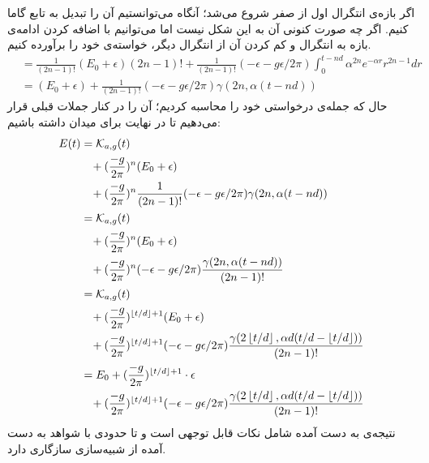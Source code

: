 اگر بازه‌ی انتگرال اول از صفر شروع می‌شد؛ آنگاه می‌توانستیم آن را تبدیل به تابع گاما کنیم. اگر چه صورت کنونی آن به این شکل نیست اما می‌توانیم با اضافه کردن ادامه‌ی بازه به انتگرال و کم کردن آن از انتگرال دیگر، خواسته‌ی خود را برآورده کنیم.
\begin{align}
	&= \frac{1}{(2n-1)!} (E_0 + \epsilon) (2n - 1)! + \frac{1}{(2n-1)!} ( - \epsilon - g\epsilon/2\pi) \int_{0}^{t - nd} \alpha^{2n} e^{-\alpha r} r^{2n-1} dr\\
	&= (E_0 + \epsilon) + \frac{1}{(2n-1)!} ( - \epsilon - g\epsilon/2\pi) \gamma(2n,\alpha( t-nd))
\end{align}
حال که جمله‌ی درخواستی خود را محاسبه کردیم؛ آن را در کنار جملات قبلی قرار می‌دهیم تا در نهایت برای میدان داشته باشیم:
\begin{align}
	E(t) &= \mathcal{K}_{a,g}(t) \\
	&\hspace{3mm}+ (\frac{-g}{2\pi})^n (E_0 + \epsilon) \\
	&\hspace{3mm}+ (\frac{-g}{2\pi})^n \frac{1}{(2n-1)!} ( - \epsilon - g\epsilon/2\pi) \gamma(2n,\alpha( t-nd))\\
	&= \mathcal{K}_{a,g}(t) \\
	&\hspace{3mm}+ (\frac{-g}{2\pi})^n (E_0 + \epsilon)\\
	&\hspace{3mm}+ (\frac{-g}{2\pi})^n ( - \epsilon - g\epsilon/2\pi) \frac{\gamma(2n,\alpha( t-nd))}{(2n-1)!}\\
	&= \mathcal{K}_{a,g}(t) \\
	&\hspace{3mm}+ (\frac{-g}{2\pi})^{\left\lfloor t/d \right\rfloor+1} (E_0 + \epsilon)\\
	&\hspace{3mm}+ (\frac{-g}{2\pi})^{\left\lfloor t/d \right\rfloor + 1} ( - \epsilon - g\epsilon/2\pi) \frac{\gamma(2\left\lfloor t/d \right\rfloor,\alpha d( t/d - \left\lfloor t/d \right\rfloor))}{(2n-1)!}\\
	&= E_0 + (\frac{-g}{2\pi})^{\left\lfloor t/d \right\rfloor+1} \cdot \epsilon\\
	&\hspace{3mm}+ (\frac{-g}{2\pi})^{\left\lfloor t/d \right\rfloor+1} ( - \epsilon - g\epsilon/2\pi) \frac{\gamma(2\left\lfloor t/d \right\rfloor,\alpha d( t/d - \left\lfloor t/d \right\rfloor))}{(2n-1)!}\\
\end{align}
نتیجه‌ی به دست آمده شامل نکات قابل توجهی است و تا حدودی با شواهد به دست آمده از شبیه‌سازی سازگاری دارد.
